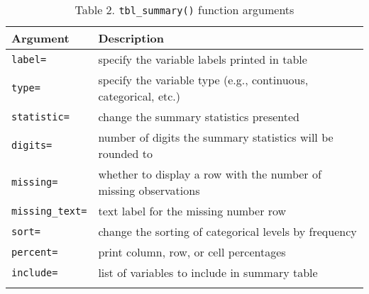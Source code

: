 \captionsetup[table]{labelformat=empty,skip=1pt}
\begin{longtable}{ll}
\toprule
Argument & Description \\ 
\midrule
\texttt{label=} & specify the variable labels printed in table \\ 
\texttt{type=} & specify the variable type (e.g., continuous, categorical, etc.) \\ 
\texttt{statistic=} & change the summary statistics presented \\ 
\texttt{digits=} & number of digits the summary statistics will be rounded to \\ 
\texttt{missing=} & whether to display a row with the number of missing observations \\ 
\texttt{missing\_text=} & text label for the missing number row \\ 
\texttt{sort=} & change the sorting of categorical levels by frequency \\ 
\texttt{percent=} & print column, row, or cell percentages \\ 
\texttt{include=} & list of variables to include in summary table \\ 
\bottomrule\caption{\label{tab:caption}Table 2. \texttt{tbl\_summary()} function arguments}\\

\end{longtable}

